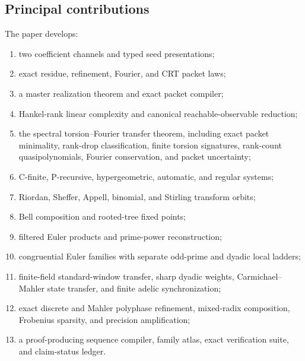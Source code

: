 \documentclass[11pt]{article}
\theoremstyle{definition}\newtheorem{definition}[theorem]{Definition}\newtheorem{example}[theorem]{Example}\newtheorem{construction}[theorem]{Construction}\newtheorem{algorithm}[theorem]{Algorithm}\newtheorem{conjecture}[theorem]{Conjecture}\newtheorem{problem}[theorem]{Problem}
\theoremstyle{remark}\newtheorem{remark}[theorem]{Remark}\newtheorem{boundary}[theorem]{Boundary}\newtheorem{certificate}[theorem]{Computational Certificate}\newtheorem{classical}[theorem]{Classical Input}\newtheorem{principle}[theorem]{Structural Principle}
\begin{document}
\subsection{Principal contributions}
The paper develops:
\begin{enumerate}
\item two coefficient channels and typed seed presentations;
\item exact residue, refinement, Fourier, and CRT packet laws;
\item a master realization theorem and exact packet compiler;
\item Hankel-rank linear complexity and canonical reachable-observable reduction;
\item the spectral torsion--Fourier transfer theorem, including exact packet minimality, rank-drop classification, finite torsion signatures, rank-count quasipolynomials, Fourier conservation, and packet uncertainty;
\item C-finite, P-recursive, hypergeometric, automatic, and regular systems;
\item Riordan, Sheffer, Appell, binomial, and Stirling transform orbits;
\item Bell composition and rooted-tree fixed points;
\item filtered Euler products and prime-power reconstruction;
\item congruential Euler families with separate odd-prime and dyadic local ladders;
\item finite-field standard-window transfer, sharp dyadic weights, Carmichael--Mahler state transfer, and finite adelic synchronization;
\item exact discrete and Mahler polyphase refinement, mixed-radix composition, Frobenius sparsity, and precision amplification;
\item a proof-producing sequence compiler, family atlas, exact verification suite, and claim-status ledger.
\end{enumerate}
\end{document}

